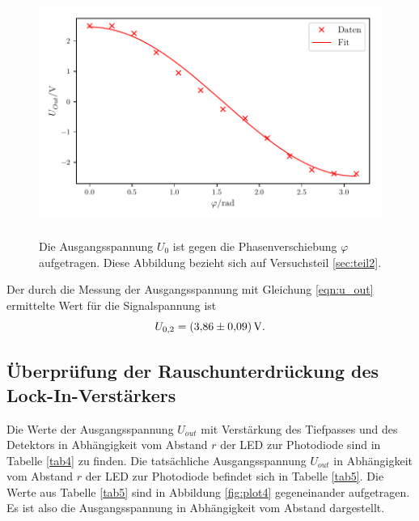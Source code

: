 \begin{figure}
    \centering
    \includegraphics[width=12cm, height=8cm]{build/plot3.pdf}
    \caption{Die Ausgangsspannung $U_{0}$ ist gegen die Phasenverschiebung $\varphi$ aufgetragen.
    Diese Abbildung bezieht sich auf Versuchsteil \ref{sec:teil2}.}
    \label{fig:plot3}
\end{figure}

\noindent Der durch die Messung der Ausgangsspannung mit Gleichung \eqref{eqn:u_out} ermittelte Wert für die Signalspannung ist
\begin{equation*}
    U_{0,2} = \SI{3.86 \pm 0.09}{\volt}.
\end{equation*}

\subsection{Überprüfung der Rauschunterdrückung des Lock-In-Verstärkers}
Die Werte der Ausgangsspannung $U_{out}$ mit Verstärkung des Tiefpasses und des Detektors in Abhängigkeit vom Abstand $r$ der LED
zur Photodiode sind in Tabelle \ref{tab4} zu finden.
Die tatsächliche Ausgangsspannung $U_{out}$ in Abhängigkeit vom Abstand $r$ der LED
zur Photodiode befindet sich in Tabelle \ref{tab5}.
Die Werte aus Tabelle \ref{tab5} sind in Abbildung \ref{fig:plot4}
gegeneinander aufgetragen. Es ist also die Ausgangsspannung in Abhängigkeit
vom Abstand dargestellt.



